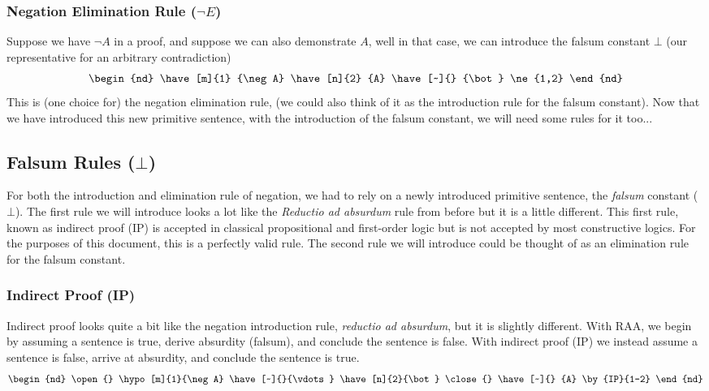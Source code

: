 \subsubsection{Negation Elimination Rule ($\neg E$)}
Suppose we have $\neg A$ in a proof, and suppose we can also demonstrate $A$, well in that case, we can introduce the falsum constant $\bot$ (our representative for an arbitrary contradiction)
\begin{equation}
    \begin{nd}
        \have[m]{1} {\neg A}
        \have[n]{2} {A}
        \have[~]{} {\bot} \ne{1,2}
    \end{nd} \nonumber
\end{equation}
This is (one choice for) the negation elimination rule, (we could also think of it as the introduction rule for the falsum constant). Now that we have introduced this new primitive sentence, with the introduction of the falsum constant, we will need some rules for it too...
\subsection{Falsum Rules ($\bot$)}
For both the introduction and elimination rule of negation, we had to rely on a newly introduced primitive sentence, the \textit{falsum} constant ($\bot$). The first rule we will introduce looks a lot like the \textit{Reductio ad absurdum} rule from before but it is a little different. This first rule, known as indirect proof (IP) is accepted in classical propositional and first-order logic but is not accepted by most constructive logics. For the purposes of this document, this is a perfectly valid rule. The second rule we will introduce could be thought of as an elimination rule for the falsum constant.

\subsubsection{Indirect Proof (IP)}
Indirect proof looks quite a bit like the negation introduction rule, \textit{reductio ad absurdum}, but it is slightly different. With RAA, we begin by assuming a sentence is true, derive absurdity (falsum), and conclude the sentence is false. With indirect proof (IP) we instead assume a sentence is false, arrive at absurdity, and conclude the sentence is true.
\begin{equation}
    \begin{nd}
    \open{}
        \hypo[m]{1}{\neg A}
        \have[~]{}{\vdots}
        \have[n]{2}{\bot}
        \close{}
        \have[~]{} {A} \by{IP}{1-2}
    \end{nd} \nonumber
\end{equation}

